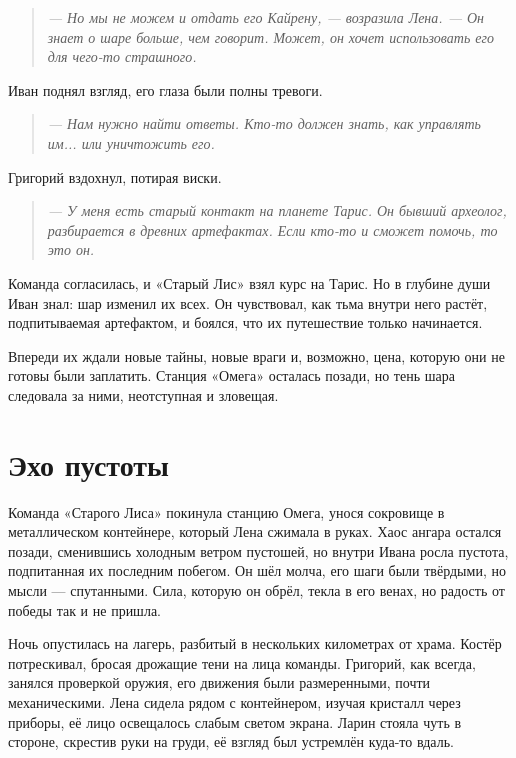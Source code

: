 \documentclass[12pt,a4paper]{book}
\newenvironment{dialogue}{\begin{quote}\itshape}{\end{quote}} %
\begin{document}
\begin{dialogue}
--- Но мы не можем и отдать его Кайрену, --- возразила Лена. --- Он знает о шаре больше, чем говорит. Может, он хочет использовать его для чего-то страшного.
\end{dialogue}

Иван поднял взгляд, его глаза были полны тревоги.

\begin{dialogue}
--- Нам нужно найти ответы. Кто-то должен знать, как управлять им... или уничтожить его.
\end{dialogue}

Григорий вздохнул, потирая виски.

\begin{dialogue}
--- У меня есть старый контакт на планете Тарис. Он бывший археолог, разбирается в древних артефактах. Если кто-то и сможет помочь, то это он.
\end{dialogue}

Команда согласилась, и «Старый Лис» взял курс на Тарис. Но в глубине души Иван знал: шар изменил их всех. Он чувствовал, как тьма внутри него растёт, подпитываемая артефактом, и боялся, что их путешествие только начинается.

Впереди их ждали новые тайны, новые враги и, возможно, цена, которую они не готовы были заплатить. Станция «Омега» осталась позади, но тень шара следовала за ними, неотступная и зловещая.

\chapter{Эхо пустоты}

Команда «Старого Лиса» покинула станцию Омега, унося сокровище в металлическом контейнере, который Лена сжимала в руках. Хаос ангара остался позади, сменившись холодным ветром пустошей, но внутри Ивана росла пустота, подпитанная их последним побегом. Он шёл молча, его шаги были твёрдыми, но мысли --- спутанными. Сила, которую он обрёл, текла в его венах, но радость от победы так и не пришла.

Ночь опустилась на лагерь, разбитый в нескольких километрах от храма. Костёр потрескивал, бросая дрожащие тени на лица команды. Григорий, как всегда, занялся проверкой оружия, его движения были размеренными, почти механическими. Лена сидела рядом с контейнером, изучая кристалл через приборы, её лицо освещалось слабым светом экрана. Ларин стояла чуть в стороне, скрестив руки на груди, её взгляд был устремлён куда-то вдаль.
\end{document}
